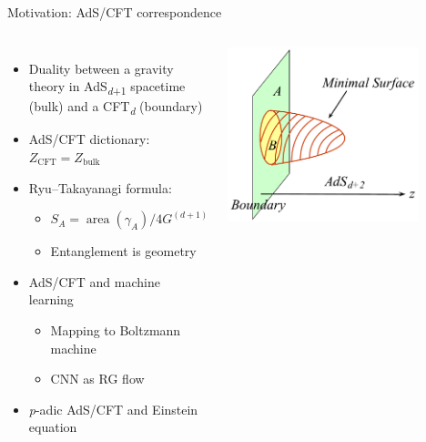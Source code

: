 \documentclass{fdubeamer}
\begin{document}
\begin{frame}{Motivation: AdS/CFT correspondence}

\begin{columns}[c]


    \begin{itemize}
      \item Duality between a gravity theory in AdS\textsubscript{\textit{d}+1} spacetime (bulk) and a CFT\textsubscript{\textit{d}} (boundary)
      \item AdS/CFT dictionary: $Z_{\mathrm{CFT}}=Z_{\mathrm{bulk}}$
      \item Ryu--Takayanagi formula:

        \begin{itemize}
          \item $S_A = \operatorname{area}(\gamma_A) / 4G^{(d+1)}$
          \item Entanglement is geometry
        \end{itemize}

      \item AdS/CFT and machine learning

        \begin{itemize}
          \item Mapping to Boltzmann machine
          \item CNN as RG flow
        \end{itemize}

      \item \textit{p}-adic AdS/CFT and Einstein equation
    \end{itemize}


    \centering
    \includegraphics[width=0.8\textwidth]{images/rt-formula.pdf}

\end{columns}


\end{frame}
\end{document}
